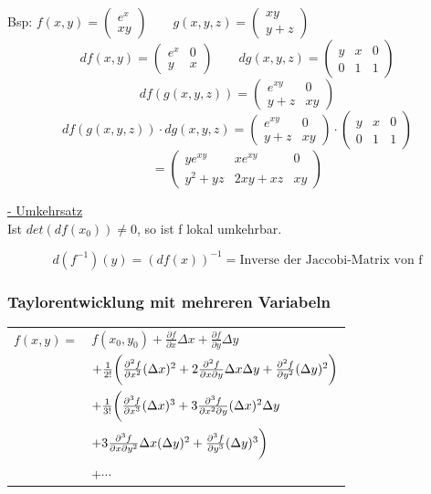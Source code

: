 \documentclass[6pt]{article}
\begin{document}
\begin{multicols*}{3}
		Bsp: \quad $ f(x,y)=\begin{pmatrix} e^x \\ xy \end{pmatrix} \qquad g(x,y,z) = \begin{pmatrix}xy\\y+z\end{pmatrix} $ \\
		\[
				df(x,y)=\begin{pmatrix} e^x & 0 \\ y & x\end{pmatrix} \qquad
				 dg(x,y,z)=\begin{pmatrix} y & x & 0 \\ 0 & 1 & 1 \end{pmatrix}  
		\]
		\[
				df(g(x,y,z)) = \begin{pmatrix} e^{xy} & 0 \\ y+z & xy\end{pmatrix}
		\]
		\[
				df(g(x,y,z)) \cdot dg(x,y,z)= \begin{pmatrix} e^{xy} & 0 \\ y+z & xy\end{pmatrix} \cdot \begin{pmatrix} y & x & 0 \\ 0 & 1 & 1 \end{pmatrix}  
		\]
		\[
				= \begin{pmatrix} ye^{xy} & xe^{xy} & 0 \\ y^2 + yz & 2xy + xz & xy \end{pmatrix}
		\]
		
		\underline{- Umkehrsatz} \vspace{3mm}\\
		Ist $det(df(x_0)) \not = 0$, so ist f lokal umkehrbar. 
		
		\[
				d(f^{-1})(y) = (df(x))^{-1} = \text{Inverse der Jaccobi-Matrix von f}
		\]		

	
	\subsubsection*{Taylorentwicklung mit mehreren Variabeln} 
	\begin{tabular}{ll}
		$f(x,y) =  $ & $f(x_0,y_0) + \frac{\partial f}{\partial x} \Delta x + \frac{\partial f}{\partial y} \Delta y$ \\
			& $ + \frac{1}{2!} \bigg{(}
						 \frac{\partial^2 f}{\partial x^2} (\Delta x)^2	
						 + 2\frac{\partial^2 f}{\partial x \partial y} \Delta x \Delta y 
						 + \frac{\partial^2 f}{\partial y^2} (\Delta y)^2	
									\bigg{)} $ \\
			& $ + \frac{1}{3!} \bigg{(}
						 \frac{\partial^3 f}{\partial x^3} (\Delta x)^3
						 + 3\frac{\partial^3 f}{\partial x^2 \partial y} (\Delta x)^2 \Delta y$ \\
			&			\qquad  $+ 3\frac{\partial^3 f}{\partial x \partial y^2} \Delta x (\Delta y)^2 
						 + \frac{\partial^3 f}{\partial y^3} (\Delta y)^3
						\bigg{)} $ \\
			& 			$+ \cdots$			
	

\end{tabular}
\end{multicols*}
\end{document}
